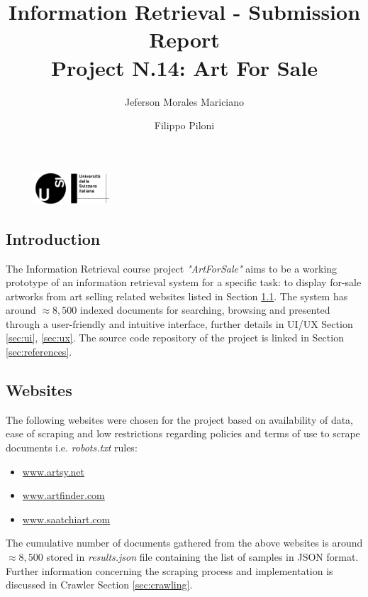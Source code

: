 \documentclass[12pt]{spieman}  %
\title{Information Retrieval - Submission Report \\Project N.14: Art For Sale}
\author{Jeferson Morales Mariciano}
\author{Filippo Piloni}
\affil{Università della Svizzera italiana, Faculty of Informatics, Lugano, Switzerland}
\begin{document}
\begin{figure}
    \includegraphics[width=0.25\textwidth, trim={0cm 0cm 0cm 7cm}]{USI_logo.png}
\end{figure}

\maketitle
\tableofcontents
\newpage

\begin{spacing}{1}   %

    \section{Introduction}
    The Information Retrieval course project \textit{"ArtForSale"} aims to be a working prototype of an
    information retrieval system for a specific task: to display for-sale artworks from art selling related
    websites listed in Section \ref{sec:websites}.
    The system has around $\approx 8,500$ indexed documents for searching, browsing and presented through a
    user-friendly and intuitive interface, further details in UI/UX Section \ref{sec:ui}, \ref{sec:ux}.
    The source code repository of the project is linked in Section \ref{sec:references}.

    \subsection{Websites}\label{sec:websites}
    The following websites were chosen for the project based on availability of data, ease of scraping and
    low restrictions regarding policies and terms of use to scrape documents i.e. \textit{robots.txt} rules:

    \begin{itemize}
        \item \url{www.artsy.net}
        \item \url{www.artfinder.com}
        \item \url{www.saatchiart.com}
    \end{itemize}

    The cumulative number of documents gathered from the above websites is around $\approx 8,500$ stored in
    \textit{results.json} file containing the list of samples in JSON format.
    Further information concerning the scraping process and implementation is discussed
    in Crawler Section \ref{sec:crawling}.


\end{spacing}
\end{document}
